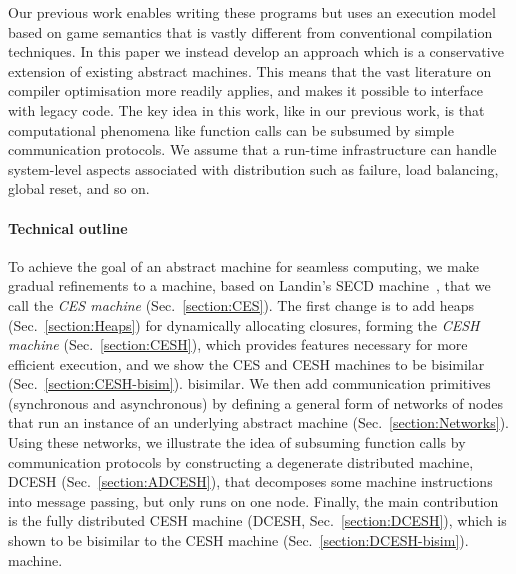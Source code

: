 \documentclass{article}
\theoremstyle{definition}
\newcommand{\DCESHi}{DCESH}
\newcommand{\DCESHn}{DCESH}
\begin{document}
Our previous work enables writing these programs but uses an execution model
based on game semantics that is vastly different from conventional compilation
techniques.  In this paper we instead develop an approach which is a conservative
extension of existing abstract machines. This means that the vast literature on
compiler optimisation more readily applies, and makes it possible to interface
with legacy code.  The key idea in this work, like in our previous work, is
that computational phenomena like function calls can be subsumed by simple
communication protocols. We assume that a run-time infrastructure can handle
system-level aspects associated with distribution such as failure, load
balancing, global reset, and so on.

\paragraph*{Technical outline}
To achieve the goal of an abstract machine for seamless computing, we make
gradual refinements to a machine, based on Landin's SECD
machine~\cite{Landin64}, that we call the \emph{CES machine}
(Sec.~\ref{section:CES}). The first change is to add heaps 
\iffullversion 
(Sec.~\ref{section:Heaps})
\fi
for dynamically allocating closures, forming the \emph{CESH machine}
(Sec.~\ref{section:CESH}), which provides features necessary for more efficient
execution, and we show the CES and CESH machines to be
\iffullversion
bisimilar (Sec.~\ref{section:CESH-bisim}).
\else
bisimilar.
\fi
We then add communication primitives (synchronous and asynchronous) by defining
a general form of networks of nodes that run an instance of an underlying abstract
machine (Sec.~\ref{section:Networks}).  Using these networks, we illustrate the
idea of subsuming function calls by communication protocols by constructing a
degenerate distributed machine, \DCESHi{} (Sec.~\ref{section:ADCESH}), that decomposes
some machine instructions into message passing, but only runs on one node.
Finally, the main contribution is the fully distributed CESH machine (\DCESHn{}, Sec.~\ref{section:DCESH}), which is shown to be bisimilar to the CESH
\iffullversion
machine (Sec.~\ref{section:DCESH-bisim}).
\else
machine.
\fi
\end{document}

